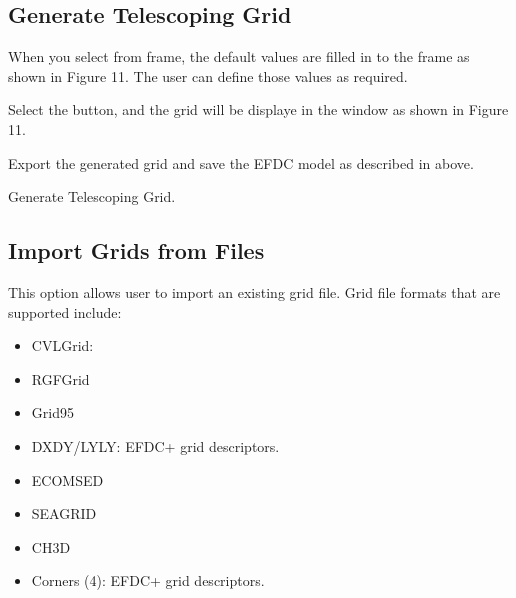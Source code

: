 \documentclass[letterpaper,10pt,english]{sphinxmanual}
\begin{document}
\subsection{Generate Telescoping Grid}
\label{\detokenize{gridgen/telescopegrid:generate-telescoping-grid}}\label{\detokenize{gridgen/telescopegrid:telescopegrid}}\label{\detokenize{gridgen/telescopegrid::doc}}
When you select  from  frame,
the default values are filled in to the  frame as
shown in Figure 11. The user can define those values as required.

Select the  button, and the grid will be displaye in the
window as shown in Figure 11.

Export the generated grid and save the EFDC model as described in
{\hyperref[\detokenize{gridgen/uniformgrid:uniformgrid}]{}} above.


 Generate Telescoping Grid.


\subsection{Import Grids from Files}
\label{\detokenize{gridgen/importgrid:import-grids-from-files}}\label{\detokenize{gridgen/importgrid:importgrid}}\label{\detokenize{gridgen/importgrid::doc}}
This option allows user to import an existing grid file. Grid file
formats that are supported include:
\begin{itemize}
\item {} 
CVLGrid: 

\item {} 
RGFGrid

\item {} 
Grid95

\item {} 
DXDY/LYLY: EFDC+ grid descriptors.

\item {} 
ECOMSED

\item {} 
SEAGRID

\item {} 
CH3D

\item {} 
Corners (4): EFDC+ grid descriptors.

\end{itemize}
\end{document}
